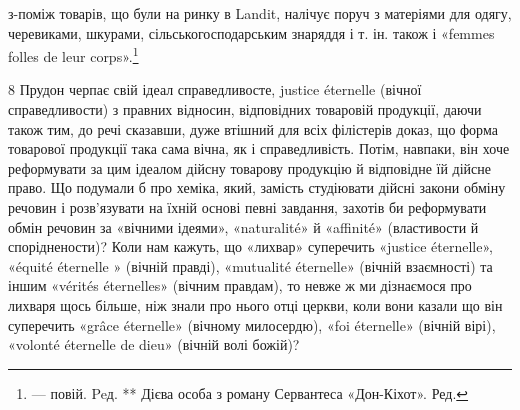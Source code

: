 з-поміж товарів, що були на ринку в Landit, налічує поруч з матеріями
для одягу, черевиками, шкурами, сільськогосподарським знаряддя і т. ін.
також і «femmes folles de leur corps».\footnote*{
— повій. Peд.
** Дієва особа з роману Сервантеса «Дон-Кіхот». Ред.
}

8 Прудон черпає свій ідеал справедливосте, justice éternelle (вічної
справедливости) з правних відносин, відповідних товаровій продукції,
даючи також тим, до речі сказавши, дуже втішний для всіх філістерів
доказ, що форма товарової продукції така сама вічна, як і справедливість.
Потім, навпаки, він хоче реформувати за цим ідеалом дійсну товарову
продукцію й відповідне їй дійсне право. Що подумали б про хеміка, який,
замість студіювати дійсні закони обміну речовин і розв’язувати на їхній
основі певні завдання, захотів би реформувати обмін речовин за «вічними
ідеями», «naturalité» й «affinité» (властивости й споріднености)? Коли
нам кажуть, що «лихвар» суперечить «justice éternelle», «équité éternelle
» (вічній правді), «mutualité éternelle» (вічній взаємності) та іншим
«vérités éternelles» (вічним правдам), то невже ж ми дізнаємося про лихваря
щось більше, ніж знали про нього отці церкви, коли вони казали
що він суперечить «grâce éternelle» (вічному милосердю), «foi éternelle»
(вічній вірі), «volonté éternelle de dieu» (вічній волі божій)?
\parbreak{}  %
